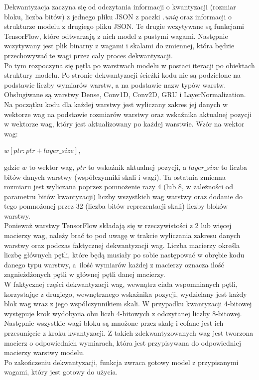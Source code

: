 Dekwantyzacja zaczyna się od odczytania informacji o kwantyzacji (rozmiar bloku, liczba bitów) z jednego pliku JSON z paczki \textit{.uniq} oraz informacji o strukturze modelu z drugiego pliku JSON. Te drugie wczytywane są funkcjami TensorFlow, które odtwarzają z nich model z pustymi wagami. Następnie wczytywany jest plik binarny z wagami i skalami do zmiennej, która będzie przechowywać te wagi przez cały proces dekwantyzacji. \\
Po tym rozpoczyna się pętla po warstwach modelu w postaci iteracji po obiektach struktury modelu. Po stronie dekwantyzacji ścieżki kodu nie są podzielone na podstawie liczby wymiarów warstw, a na podstawie nazw typów warstw. Obsługiwane są warstwy Dense, Conv1D, Conv2D, GRU i LayerNormalization. Na początku kodu dla każdej warstwy jest wyliczany zakres jej danych w wektorze wag na podstawie rozmiarów warstwy oraz wskaźnika aktualnej pozycji w wektorze wag, który jest aktualizowany po każdej warstwie. Wzór na wektor wag: \\
\vspace{-1.5em}
\begin{center}
$\mathit{w}[\mathit{ptr} : \mathit{ptr} + \mathit{layer\_size}]$, \\
\end{center}
gdzie $\mathit{w}$ to wektor wag, $\mathit{ptr}$ to wskaźnik aktualnej pozycji, a $\mathit{layer\_size}$ to liczba bitów danych warstwy (współczynniki skali i wagi). Ta ostatnia zmienna rozmiaru jest wyliczana poprzez pomnożenie razy 4 (lub 8, w zależności od parametru bitów kwantyzacji) liczby wszystkich wag warstwy oraz dodanie do tego pomnożonej przez 32 (liczba bitów reprezentacji skali) liczby bloków warstwy. \\
Ponieważ warstwy TensorFlow składają się w rzeczywistości z 2 lub więcej macierzy wag, należy brać to pod uwagę w trakcie wyliczania zakresu danych warstwy oraz podczas faktycznej dekwantyzacji wag. Liczba macierzy określa liczbę głównych pętli, które będą musiały po sobie następować w obrębie kodu danego typu warstwy, a~ilość wymiarów każdej z macierzy oznacza ilość zagnieżdżonych pętli w głównej pętli danej macierzy. \\
W faktycznej części dekwantyzacji wag, wewnątrz ciała wspomnianych pętli, korzystając z drugiego, wewnętrznego wskaźnika pozycji, wydzielany jest każdy blok wag wraz z jego współczynnikiem skali. W przypadku kwantyzacji 4-bitowej występuje krok wydobycia obu liczb 4-bitowych z odczytanej liczby 8-bitowej. Następnie wszystkie wagi bloku są mnożone przez skalę i cofane jest ich przesunięcie z kroku kwantyzacji. Z takich zdekwantyzowanych wag jest tworzona macierz o odpowiednich wymiarach, która jest przypisywana do odpowiedniej macierzy warstwy modelu. \\
Po zakończeniu dekwantyzacji, funkcja zwraca gotowy model z przypisanymi wagami, który jest gotowy do użycia.

